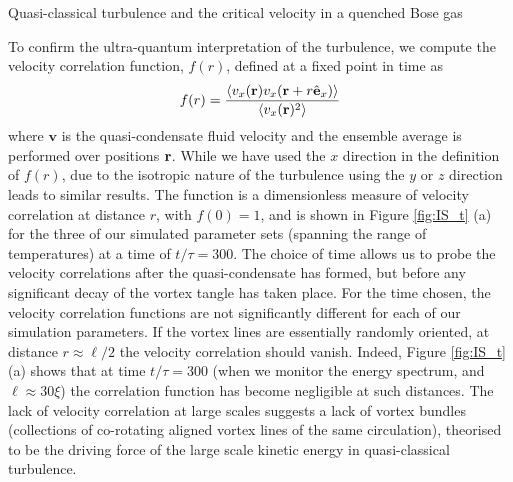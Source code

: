 \begin{chapter}{\label{cha:nonequib}Quasi-classical turbulence and the critical velocity in a quenched Bose gas}
\begin{figure}
\end{figure}
To confirm the ultra-quantum interpretation of the turbulence, we compute the velocity correlation function, $f(r)$, defined at a fixed point in time as
\begin{equation}
f(r) = \frac{\langle v_x({\bf r})v_x({\bf r} +  r\hat{\bf e}_x) \rangle}{\langle v_x({\bf r})^2 \rangle}
\end{equation}
where $\mathbf{v}$ is the quasi-condensate fluid velocity and the ensemble average is performed over positions ${\bf r}$. While we have used the $x$ direction in the definition of $f(r)$, due to the isotropic nature of the turbulence using the $y$ or $z$ direction leads to similar results. The function is a dimensionless measure of velocity correlation at distance $r$, with $f(0)=1$, and is shown in Figure \ref{fig:IS_t} (a) for the three of our simulated parameter sets (spanning the range of temperatures) at a time of $t/\tau = 300$. The choice of time allows us to probe the velocity correlations after the quasi-condensate has formed, but before any significant decay of the vortex tangle has taken place. For the time chosen, the velocity correlation functions are not significantly different for each of our simulation parameters. %
If the vortex lines are essentially randomly oriented, at distance $r \approx \ell/2$ the velocity correlation should vanish. Indeed, Figure \ref{fig:IS_t} (a) shows that at time $t/\tau=300$ (when we monitor the
energy spectrum, and $\ell \approx 30 \xi$) the correlation function has become negligible at such distances.
The lack of velocity correlation at large scales suggests a lack of vortex bundles (collections of co-rotating aligned vortex lines of the same circulation), theorised to be the driving force of the large scale kinetic energy in quasi-classical turbulence.


\end{chapter}

